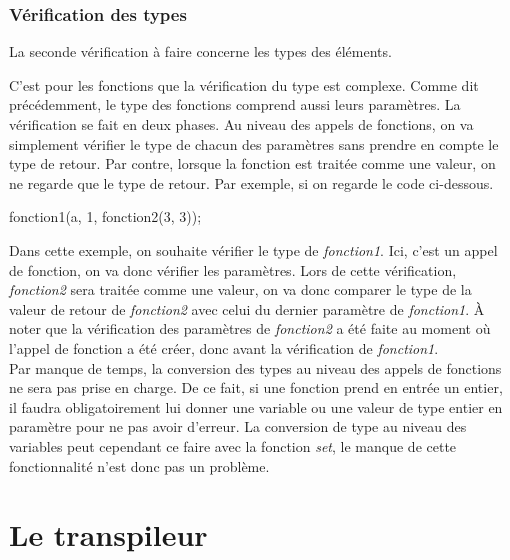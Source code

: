 \documentclass[a4paper]{article}%
\begin{document}
\subsubsection*{Vérification des types} %

La seconde vérification à faire concerne les types des éléments.



C'est pour les fonctions que la vérification du type est complexe. Comme dit
précédemment, le type des fonctions comprend aussi leurs paramètres. La
vérification se fait en deux phases. Au niveau des appels de fonctions, on va
simplement vérifier le type de chacun des paramètres sans prendre en compte le
type de retour. Par contre, lorsque la fonction est traitée comme une valeur, on
ne regarde que le type de retour. Par exemple, si on regarde le code ci-dessous.

\begin{grammar}[language=C++]
  fonction1(a, 1, fonction2(3, 3));
\end{grammar}\leavevmode\newline

Dans cette exemple, on souhaite vérifier le type de \textit{fonction1}. Ici,
c'est un appel de fonction, on va donc vérifier les paramètres. Lors de cette
vérification, \textit{fonction2} sera traitée comme une valeur, on va donc
comparer le type de la valeur de retour de \textit{fonction2} avec celui du
dernier paramètre de \textit{fonction1}. À noter que la vérification des
paramètres de \textit{fonction2} a été faite au moment où l'appel de fonction a
été créer, donc avant la vérification de \textit{fonction1}.\\

Par manque de temps, la conversion des types au niveau des appels de fonctions
ne sera pas prise en charge. De ce fait, si une fonction prend en entrée un
entier, il faudra obligatoirement lui donner une variable ou une valeur de type
entier en paramètre pour ne pas avoir d'erreur. La conversion de type au niveau
des variables peut cependant ce faire avec la fonction \textit{set}, le manque
de cette fonctionnalité n'est donc pas un problème.


\section{Le transpileur}
\end{document}
